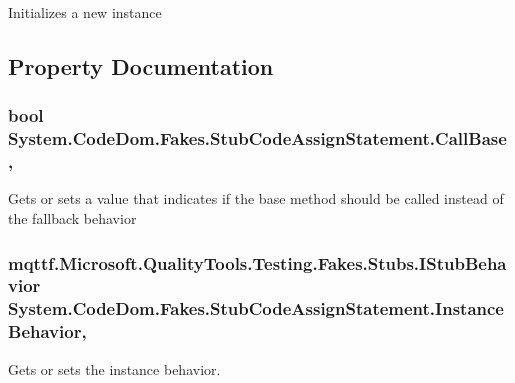 Initializes a new instance



\subsection{Property Documentation}
\hypertarget{class_system_1_1_code_dom_1_1_fakes_1_1_stub_code_assign_statement_a378cd90be943e67c45326008203d04df}{
\subsubsection[{Call\-Base}]{\setlength{\rightskip}{0pt plus 5cm}bool System.\-Code\-Dom.\-Fakes.\-Stub\-Code\-Assign\-Statement.\-Call\-Base\hspace{0.3cm}{\ttfamily [get]}, {\ttfamily [set]}}}\label{class_system_1_1_code_dom_1_1_fakes_1_1_stub_code_assign_statement_a378cd90be943e67c45326008203d04df}


Gets or sets a value that indicates if the base method should be called instead of the fallback behavior

\hypertarget{class_system_1_1_code_dom_1_1_fakes_1_1_stub_code_assign_statement_a77f8656315b9a563004bf3c66a4e2cce}{
\subsubsection[{Instance\-Behavior}]{\setlength{\rightskip}{0pt plus 5cm}mqttf.\-Microsoft.\-Quality\-Tools.\-Testing.\-Fakes.\-Stubs.\-I\-Stub\-Behavior System.\-Code\-Dom.\-Fakes.\-Stub\-Code\-Assign\-Statement.\-Instance\-Behavior\hspace{0.3cm}{\ttfamily [get]}, {\ttfamily [set]}}}\label{class_system_1_1_code_dom_1_1_fakes_1_1_stub_code_assign_statement_a77f8656315b9a563004bf3c66a4e2cce}


Gets or sets the instance behavior.

